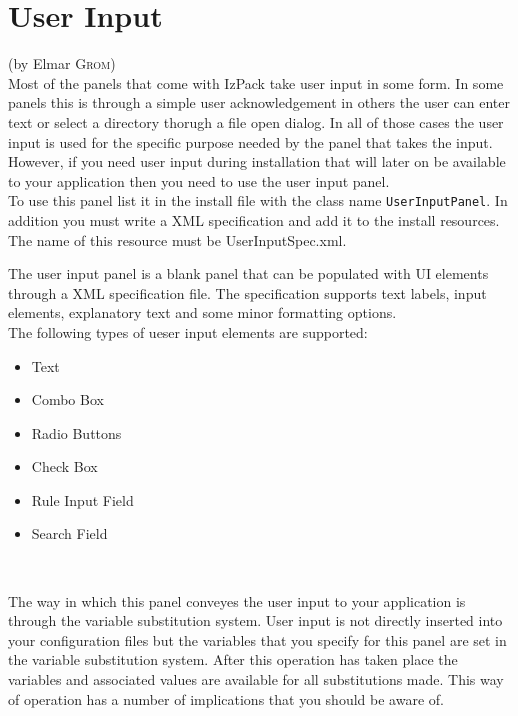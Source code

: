 

\chapter{\label{chap:userinput}User Input} (by Elmar \textsc{Grom})\\

Most of the panels that come with IzPack take user input in some form.
In some panels this is through a simple user acknowledgement in others
the user can enter text or select a directory thorugh a file open
dialog. In all of those cases the user input is used for the specific
purpose  needed by the panel that takes the input. However, if you need
user input during installation that will later on be available  to your
application then you need to use the user input panel.\\

{\sloppy To use this panel list it in the install file with the class name
\texttt{UserInputPanel}. In addition you must write a XML specification
and add it to the install resources. The name of this resource must be
UserInputSpec.xml.}

The user input panel is a blank panel that can be populated with UI
elements through a XML specification file. The specification supports
text labels, input elements, explanatory text and some minor formatting
options.\\

The following types of ueser input elements are supported:
\begin{itemize}
\item Text
\item Combo Box
\item Radio Buttons
\item Check Box
\item Rule Input Field
\item Search Field
\end{itemize}\

The way in which this panel conveyes the user input to your application
is through the variable substitution system. User input is not directly
inserted into your configuration files but the variables that you
specify for this panel are set in the variable substitution system.
After this operation has taken place the variables and associated values
are available for all substitutions made. This way of operation has a
number of implications that you should be aware of.\\

